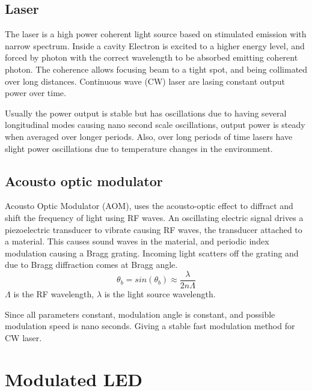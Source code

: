 \documentclass[\main/master.tex]{subfiles}
\begin{document}
\subsection{Laser}


The laser is a high power coherent light source based on stimulated emission with narrow spectrum. Inside a cavity Electron is excited to a higher energy level, and forced by photon with the correct wavelength to be absorbed emitting coherent photon. The coherence allows focusing beam to a tight spot, and being collimated over long distances. Continuous wave (CW) laser are lasing constant output power over time.



\par\noindent
Usually the power output is stable but has oscillations due to having several longitudinal modes causing nano second scale oscillations, output power is steady when averaged over longer periods. Also, over long periods of time lasers have slight power oscillations due to temperature changes in the environment.

\subsection{Acousto optic modulator}
Acousto Optic Modulator (AOM), uses the acousto-optic effect to diffract and shift the frequency of light using RF waves. An oscillating electric signal drives a piezoelectric transducer to vibrate causing RF waves, the transducer attached to a material. This causes sound waves in the material, and periodic index modulation causing a Bragg grating. Incoming light scatters off the grating and due to Bragg diffraction comes at Bragg angle.
\begin{equation}
\theta_b = sin(\theta_b)\approx \frac{\lambda}{2n\Lambda} \label{eqn:energy-mass-equivalence-relation}
\end{equation} 
$\Lambda$ is the RF wavelength, $\lambda$ is the light source wavelength. 
\par\noindent
Since all parameters constant, modulation angle is constant, and possible modulation speed is nano seconds. Giving a stable fast modulation method for CW laser.


\section{Modulated LED}
\end{document}
